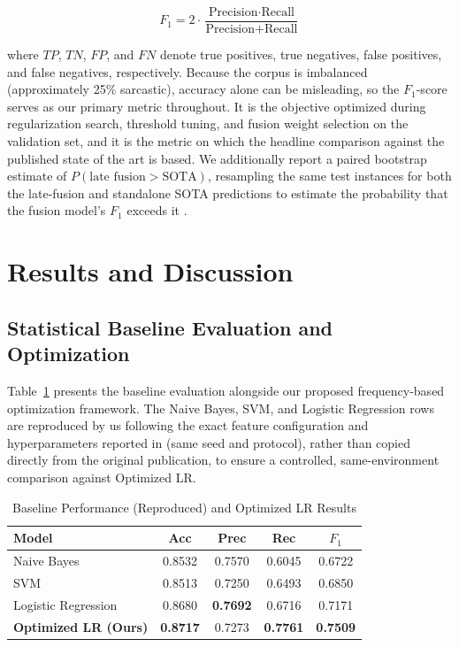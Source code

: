 \documentclass[conference]{IEEEtran}
\begin{document}
\begin{equation}
F_1 = 2 \cdot \frac{\text{Precision} \cdot \text{Recall}}{\text{Precision} + \text{Recall}}
\label{eq:f1}
\end{equation}

\noindent where $TP$, $TN$, $FP$, and $FN$ denote true positives, true negatives, false positives, and false negatives, respectively. Because the corpus is imbalanced (approximately 25\% sarcastic), accuracy alone can be misleading, so the $F_1$-score serves as our primary metric throughout. It is the objective optimized during regularization search, threshold tuning, and fusion weight selection on the validation set, and it is the metric on which the headline comparison against the published state of the art is based. We additionally report a paired bootstrap estimate of $P(\text{late fusion} > \text{SOTA})$, resampling the same test instances for both the late-fusion and standalone SOTA predictions to estimate the probability that the fusion model's $F_1$ exceeds it \cite{dror2018hitchhiker}.

\section{Results and Discussion}
\label{sec:results}

\subsection{Statistical Baseline Evaluation and Optimization}

Table~\ref{tab:baselines} presents the baseline evaluation alongside our proposed frequency-based optimization framework. The Naive Bayes, SVM, and Logistic Regression rows are reproduced by us following the exact feature configuration and hyperparameters reported in \cite{idsarcasm} (same seed and protocol), rather than copied directly from the original publication, to ensure a controlled, same-environment comparison against Optimized LR.

\begin{table}[htbp]
\caption{Baseline Performance (Reproduced) and Optimized LR Results}
\begin{center}
\begin{tabular}{lcccc}
\hline
\textbf{Model} & \textbf{Acc} & \textbf{Prec} & \textbf{Rec} & \textbf{$F_1$} \\ \hline
\quad Naive Bayes \cite{idsarcasm} & 0.8532 & 0.7570 & 0.6045 & 0.6722 \\
\quad SVM \cite{idsarcasm} & 0.8513 & 0.7250 & 0.6493 & 0.6850 \\
\quad Logistic Regression \cite{idsarcasm} & 0.8680 & \textbf{0.7692} & 0.6716 & 0.7171 \\ 
\quad \textbf{Optimized LR (Ours)} & \textbf{0.8717} & 0.7273 & \textbf{0.7761} & \textbf{0.7509} \\ \hline
\end{tabular}
\label{tab:baselines}
\end{center}
\end{table}
\end{document}
